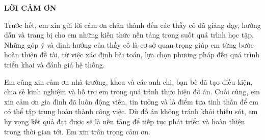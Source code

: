 \documentclass[../DoAn.tex]{subfiles}
\begin{document}
\begin{center}
    \Large{\textbf{LỜI CẢM ƠN}}\\
\end{center}
\vspace{1cm}
Trước hết, em xin gửi lời cảm ơn chân thành đến các thầy cô đã giảng dạy, hướng dẫn và trang bị cho em những kiến thức nền tảng trong suốt quá trình học tập. Những góp ý và định hướng của thầy cô là cơ sở quan trọng giúp em từng bước hoàn thiện đề tài, từ việc xác định bài toán, lựa chọn phương pháp đến quá trình triển khai và đánh giá hệ thống.

Em cũng xin cảm ơn nhà trường, khoa và các anh chị, bạn bè đã tạo điều kiện, chia sẻ kinh nghiệm và hỗ trợ em trong quá trình thực hiện đồ án. Cuối cùng, em xin cảm ơn gia đình đã luôn động viên, tin tưởng và là điểm tựa tinh thần để em có thể tập trung hoàn thành công việc. Dù đồ án không tránh khỏi thiếu sót, em hy vọng kết quả đạt được sẽ là nền tảng để tiếp tục phát triển và hoàn thiện trong thời gian tới. Em xin trân trọng cảm ơn.
\end{document}
